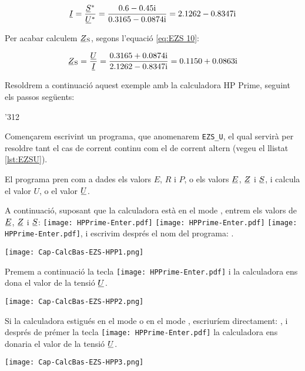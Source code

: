 \begin{exemple}
    \[
       \cmplx{I} = \frac{\cmplx{S}^*}{\cmplx{U}^*} = \frac{\complexnum{0,6-j 0,45}}{\complexnum{0,3165 - j 0,0874}}
       = \complexnum{2,1262 - j 0,8347}
    \]

    Per acabar calculem $\cmplx{Z}\ped{S}$, segons l'equació
    \eqref{eq:EZS 10}:

    \[
        \cmplx{Z}\ped{S} = \frac{\cmplx{U}}{\cmplx{I}} = \frac{\complexnum{0,3165 + j 0,0874}}
        {\complexnum{2,1262 - j 0,8347}} = \complexnum{0,1150 + j 0,0863}
    \]

    Resoldrem a continuació aquest exemple amb la calculadora \textsf{HP Prime}, seguint els passos següents:
    \begin{dingautolist}{'312}
        \item Començarem escrivint un programa, que anomenarem  \texttt{EZS\_U}, el qual servirà per resoldre tant el cas de corrent continu com el de corrent altern (vegeu el llistat \vref{lst:EZSU}).

        El programa pren com a dades els valors  $E$, $R$ i $P$, o els valors  $\cmplx{E}$, $\cmplx{Z}$ i $\cmplx{S}$, i calcula el valor  $U$, o el valor $\cmplx{U}$.


    \item A continuació, suposant  que la calculadora està en el mode , entrem els valors de $\cmplx{E}$, $\cmplx{Z}$ i $\cmplx{S}$:  \texttt{[image: HPPrime-Enter.pdf]}  \texttt{[image: HPPrime-Enter.pdf]}  \texttt{[image: HPPrime-Enter.pdf]}, i  escrivim després el nom del programa: .

        \texttt{[image: Cap-CalcBas-EZS-HPP1.png]}

    \item Premem a continuació la tecla \texttt{[image: HPPrime-Enter.pdf]} i la calculadora ens dona el valor de la tensió $\cmplx{U}$.

        \texttt{[image: Cap-CalcBas-EZS-HPP2.png]}


     \item   Si la calculadora estigués en el mode  o en el mode  , escriuríem directament: , i després de prémer la tecla \texttt{[image: HPPrime-Enter.pdf]} la calculadora ens donaria el valor de la tensió $\cmplx{U}$.

        \texttt{[image: Cap-CalcBas-EZS-HPP3.png]}

    \end{dingautolist}
\end{exemple}




